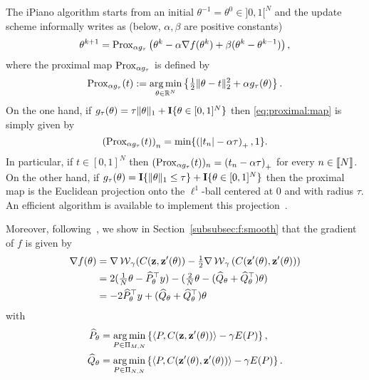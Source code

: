 The       iPiano       algorithm       starts      from       an       initial
$\theta^{-1}  = \theta^{0}  \in ]0,1[^{N}$  and the  update scheme  informally
writes as (below, $\alpha,\beta$ are positive constants)
\begin{equation}
  \theta^{k+1} = \operatorname{Prox}_{\alpha g_{\tau}} \left(\theta^k - \alpha \nabla f(\theta^k) +
    \beta (\theta^k - \theta^{k-1}) \right), 
\end{equation}
where the proximal map $\operatorname{Prox}_{\alpha g_{\tau}}$ is defined by
\begin{equation}
  \label{eq:proximal:map}
  \operatorname{Prox}_{\alpha  g_{\tau}}   (t)  :=  \mathop{\arg\min}_{\theta   \in  \mathbb{R}^N}
  \left\{\tfrac{1}{2}\|\theta-t\|_2^2 + \alpha g_{\tau}(\theta)\right\}.  
\end{equation}
On                the                one               hand,                if
$g_{\tau} (\theta) =  \tau \|\theta\|_{1} + \textbf{I}\{\theta  \in [0,1]^{N}\}$ then
\eqref{eq:proximal:map} is simply given by
\begin{equation*}
  \left(\operatorname{Prox}_{\alpha g_{\tau}} (t)\right)_{n} = \min\{\left(|t_{n}| -
    \alpha\tau\right)_{+}, 1\}.  
\end{equation*}
In       particular,        if       $t       \in        [0,1]^{N}$       then
$(\operatorname{Prox}_{\alpha g_{\tau}} (t))_{n} =  \left(t_{n} - \alpha\tau\right)_{+}$ for
every     $n    \in     \llbracket    N\rrbracket$.      On    the     other    hand,     if
$g_{\tau}  (\theta)  =  \textbf{I}\{\|\theta\|_{1}  \leq  \tau\}  +  \textbf{I}\{\theta  \in
[0,1]^{N}\}$  then the  proximal  map  is the  Euclidean  projection onto  the
$\ell^{1}$-ball centered at 0 and  with radius $\tau$.  An efficient algorithm
is available to implement this projection~\cite{L1-ball}.

Moreover,   following~\cite[Section   4.3]{pmlr-v32-cuturi14},  we   show   in
Section~\ref{subsubsec:f:smooth} that the gradient of $f$ is given by
\begin{align}
  \notag
  \nabla f(\theta)
  &  =  \nabla  \operatorname{\mathcal{W}}_{\gamma}  (C(\textbf{z}, \textbf{z}'(\theta))  -  \tfrac{1}{2}  \nabla
    \operatorname{\mathcal{W}}_{\gamma} \left(C(\textbf{z}'(\theta), \textbf{z}'(\theta))\right) \\
  \notag
  &    =    2(\tfrac{1}{N}\theta    -   \widehat{P}_{\theta}^{\top}    y)    -
    (\tfrac{2}{N}\theta - (\widehat{Q}_{\theta} + \widehat{Q}_{\theta}^{\top})
    \theta)\\
  \label{eq:gradient:f}
  &   =   -2   \widehat{P}_{\theta}^{\top}   y   +   (\widehat{Q}_{\theta}   +
    \widehat{Q}_{\theta}^{\top} )    \theta
\end{align}
with
\begin{align}
  \label{eq:hatPtheta}
  \widehat{P}_{\theta} 
  & = \mathop{\arg\min}_{P \in \Pi_{M,N}}
    \left\{\langle P, C(\textbf{z},\textbf{z}'(\theta)) \rangle - \gamma E(P)\right\},\\ 
  \label{eq:hatQtheta}
  \widehat{Q}_{\theta} 
  & = \mathop{\arg\min}_{P \in \Pi_{N,N}}
    \left\{\langle   P,  C(\textbf{z}'(\theta),   \textbf{z}'(\theta))   \rangle  -   \gamma
    E(P)\right\}. 
\end{align}

